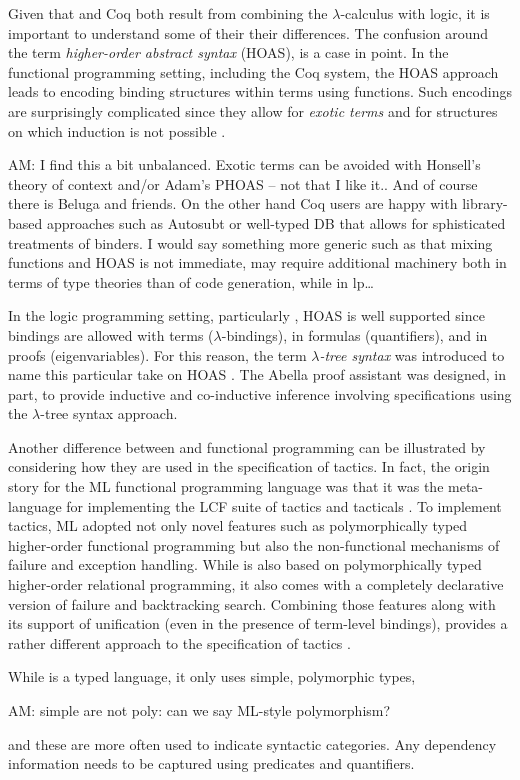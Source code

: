 Given that \lP and Coq both result from combining the
$\lambda$-calculus with logic, it is important to understand some of
their their differences.  The confusion around the term
\emph{higher-order abstract syntax} (HOAS), is a case in point.  In
the functional programming setting, including the Coq system, the HOAS
approach leads to encoding binding structures within terms using
functions.  Such encodings are surprisingly complicated since they
allow for \emph{exotic terms} \cite{despeyroux95tlca} and for
structures on which induction is not possible \cite{roeckl01fossacs}.
\begin{metanote}
  AM: I find this a bit unbalanced. Exotic terms can be avoided with
  Honsell's theory of context and/or Adam's PHOAS -- not that I like
  it.. And of course there is Beluga and friends.  On the other hand
  Coq users are happy with library-based approaches such as Autosubt or well-typed DB
  that allows for sphisticated treatments of binders. I would say something more generic such as that mixing functions and HOAS is not immediate, may require additional machinery both in terms of type theories than of code generation, while in lp\dots
\end{metanote}
In the logic programming setting, particularly \lP, HOAS is well
supported since bindings are allowed with terms ($\lambda$-bindings),
in formulas (quantifiers), and in proofs (eigenvariables).  For this
reason, the term \emph{$\lambda$-tree syntax} was introduced to name
this particular take on HOAS \cite{miller19jar}.  The Abella proof
assistant \cite{baelde14jfr} was designed, in part, to provide
inductive and co-inductive inference involving specifications using
the $\lambda$-tree syntax approach.

Another difference between \lP and functional programming can be
illustrated by considering how they are used in the specification of
tactics.  In fact, the origin story for the ML functional programming
language was that it was the meta-language for implementing the LCF
suite of tactics and tacticals \cite{gordon79}.  To implement tactics,
ML adopted not only novel features such as polymorphically typed
higher-order functional programming but also the non-functional
mechanisms of failure and exception handling.  While \lP is also based
on polymorphically typed higher-order relational programming, it also
comes with a completely declarative version of failure and
backtracking search.  Combining those features along with its support
of unification (even in the presence of term-level bindings), \lP
provides a rather different approach to the specification of tactics
\cite{felty93jar}.


While \lP is a typed language, it only uses simple, polymorphic types,
\begin{metanote}
AM:  simple are not poly: can we say ML-style polymorphism?
\end{metanote}
and these are more often used to indicate syntactic categories.  Any
dependency information needs to be captured using predicates and
quantifiers.
